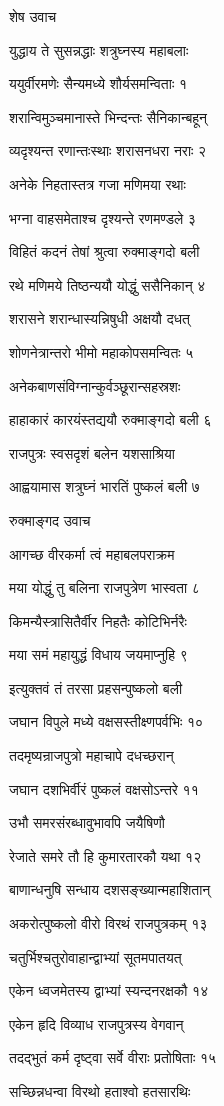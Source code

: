शेष उवाच

युद्धाय ते सुसन्नद्धाः शत्रुघ्नस्य महाबलाः

ययुर्वीरमणेः सैन्यमध्ये शौर्यसमन्विताः १

शरान्विमुञ्चमानास्ते भिन्दन्तः सैनिकान्बहून्

व्यदृश्यन्त रणान्तःस्थाः शरासनधरा नराः २

अनेके निहतास्तत्र गजा मणिमया रथाः

भग्ना वाहसमेताश्च दृश्यन्ते रणमण्डले ३

विहितं कदनं तेषां श्रुत्वा रुक्माङ्गदो बली

रथे मणिमये तिष्ठन्ययौ योद्धुं ससैनिकान् ४

शरासने शरान्धास्यन्निषुधी अक्षयौ दधत्

शोणनेत्रान्तरो भीमो महाकोपसमन्वितः ५

अनेकबाणसंविग्नान्कुर्वञ्छूरान्सहस्रशः

हाहाकारं कारयंस्तद्ययौ रुक्माङ्गदो बली ६

राजपुत्रः स्वसदृशं बलेन यशसाश्रिया

आह्वयामास शत्रुघ्नं भारतिं पुष्कलं बली ७

रुक्माङ्गद उवाच

आगच्छ वीरकर्मा त्वं महाबलपराक्रम

मया योद्धुं तु बलिना राजपुत्रेण भास्वता ८

किमन्यैस्त्रासितैर्वीर निहतैः कोटिभिर्नरैः

मया समं महायुद्धं विधाय जयमाप्नुहि ९

इत्युक्तवं तं तरसा प्रहसन्पुष्कलो बली

जघान विपुले मध्ये वक्षसस्तीक्ष्णपर्वभिः १०

तदमृष्यन्राजपुत्रो महाचापे दधच्छरान्

जघान दशभिर्वीरं पुष्कलं वक्षसोऽन्तरे ११

उभौ समरसंरब्धावुभावपि जयैषिणौ

रेजाते समरे तौ हि कुमारतारकौ यथा १२

बाणान्धनुषि सन्धाय दशसङ्ख्यान्महाशितान्

अकरोत्पुष्कलो वीरो विरथं राजपुत्रकम् १३

चतुर्भिश्चतुरोवाहान्द्वाभ्यां सूतमपातयत्

एकेन ध्वजमेतस्य द्वाभ्यां स्यन्दनरक्षकौ १४

एकेन हृदि विव्याध राजपुत्रस्य वेगवान्

तदद्भुतं कर्म दृष्ट्वा सर्वे वीराः प्रतोषिताः १५

सच्छिन्नधन्वा विरथो हताश्वो हतसारथिः

